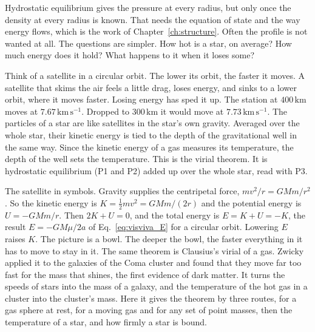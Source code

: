 Hydrostatic equilibrium gives the pressure at every radius, but only once the density at every radius is known. That needs the equation of state and the way energy flows, which is the work of Chapter~\ref{ch:structure}. Often the profile is not wanted at all. The questions are simpler. How hot is a star, on average? How much energy does it hold? What happens to it when it loses some?

Think of a satellite in a circular orbit. The lower its orbit, the faster it moves. A satellite that skims the air feels a little drag, loses energy, and sinks to a lower orbit, where it moves faster. Losing energy has sped it up. The station at $400\,\mathrm{km}$ moves at $7.67\,\mathrm{km\,s^{-1}}$. Dropped to $300\,\mathrm{km}$ it would move at $7.73\,\mathrm{km\,s^{-1}}$. The particles of a star are like satellites in the star's own gravity. Averaged over the whole star, their kinetic energy is tied to the depth of the gravitational well in the same way. Since the kinetic energy of a gas measures its temperature, the depth of the well sets the temperature. This is the virial theorem. It is hydrostatic equilibrium (P1 and P2) added up over the whole star, read with P3.

The satellite in symbols. Gravity supplies the centripetal force, $m v^2/r=GMm/r^2$. So the kinetic energy is $K=\tfrac12mv^2=GMm/(2r)$ and the potential energy is $U=-GMm/r$. Then $2K+U=0$, and the total energy is $E=K+U=-K$, the result $E=-GM\mu/2a$ of Eq.~\eqref{eq:visviva_E} for a circular orbit. Lowering $E$ raises $K$. The picture is a bowl. The deeper the bowl, the faster everything in it has to move to stay in it. The same theorem is Clausius's virial of a gas. Zwicky applied it to the galaxies of the Coma cluster and found that they move far too fast for the mass that shines, the first evidence of dark matter. It turns the speeds of stars into the mass of a galaxy, and the temperature of the hot gas in a cluster into the cluster's mass. Here it gives the theorem by three routes, for a gas sphere at rest, for a moving gas and for any set of point masses, then the temperature of a star, and how firmly a star is bound.


